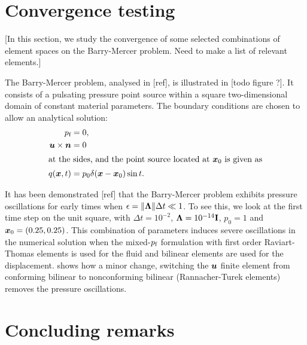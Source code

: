 

\section{Convergence testing}

[In this section, we study the convergence of some selected combinations of
  element spaces on the Barry-Mercer problem. Need to make a list of relevant
  elements.]

The Barry-Mercer problem, analysed in [ref], is illustrated in [todo figure ?].
It consists of a pulsating pressure point source within a square
two-dimensional domain of constant material parameters.
The boundary conditions are chosen to allow an analytical solution:
\begin{align*}
  p_{\text{f}} &= 0, \\
  \boldsymbol{u} \times \boldsymbol{n} &= 0\\
\intertext{at the sides, and the point source located at $\boldsymbol{x}_0$ is given as}
q(\boldsymbol{x},t) &= p_0 \delta(\boldsymbol{x}-\boldsymbol{x}_0) \sin t.
\end{align*}

It has been demonstrated [ref] that the Barry-Mercer problem exhibits pressure
oscillations for early times when $\epsilon=\norm{\Lambda} \Delta t \ll 1$.
To see this, we look at the first time step on the unit square, with $\Delta
t=10^{-2}$, $\Lambda=10^{-14}\VV{I}$, $p_0=1$ and $\boldsymbol{x}_0=(0.25,0.25)$.
This combination of parameters induces severe oscillations in the numerical
solution when the mixed-$p_{\text{f}}$ formulation with first order Raviart-Thomas
elements is used for the fluid and bilinear elements are used for the displacement.
 shows
how a minor change, switching the $\boldsymbol{u}$ finite element from conforming bilinear
to nonconforming bilinear (Rannacher-Turek elements) removes the pressure
oscillations.


\section{Concluding remarks}



\acks









